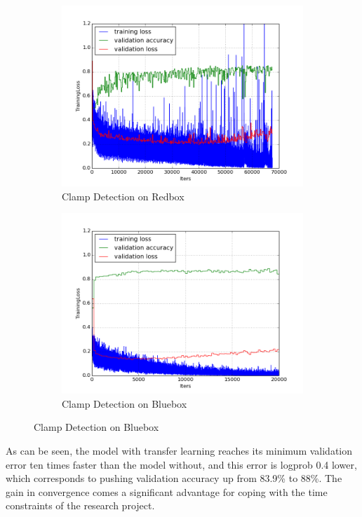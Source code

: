 \documentclass[a4paper,11pt]{article}
\begin{document}
\begin{figure}[h!]
	\centering
	\begin{subfigure}{.5\textwidth}
  		\centering
		\includegraphics[scale=0.4]{images/plot_clampdet_tl_wout.png}
		\caption{Clamp Detection on Redbox}
	\end{subfigure}%
	\begin{subfigure}{.5\textwidth}
  		\centering
		\includegraphics[scale=0.4]{images/plot_clampdet_none.png}
		\caption{Clamp Detection on Bluebox}
	\end{subfigure}
\end{figure}

As can be seen, the model with transfer learning reaches its minimum validation error ten times faster than the model without, and this error is logprob 0.4 lower, which corresponds to pushing validation accuracy up from 83.9\% to 88\%. The gain in convergence comes a significant advantage for coping with the time constraints of the research project. 
\end{document}
